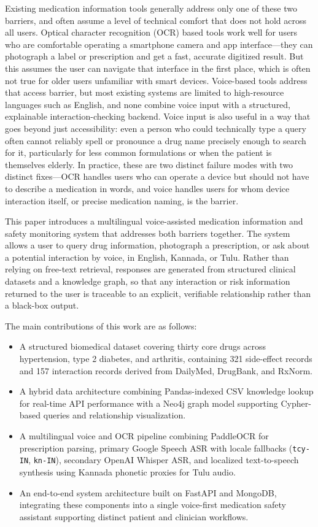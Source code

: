 \documentclass[9pt,journal,twoside,web]{ieeecolor}
\begin{document}
Existing medication information tools generally address only one of these two barriers, and often assume a level of technical comfort that does not hold across all users. Optical character recognition (OCR) based tools work well for users who are comfortable operating a smartphone camera and app interface---they can photograph a label or prescription and get a fast, accurate digitized result. But this assumes the user can navigate that interface in the first place, which is often not true for older users unfamiliar with smart devices. Voice-based tools address that access barrier, but most existing systems are limited to high-resource languages such as English, and none combine voice input with a structured, explainable interaction-checking backend. Voice input is also useful in a way that goes beyond just accessibility: even a person who could technically type a query often cannot reliably spell or pronounce a drug name precisely enough to search for it, particularly for less common formulations or when the patient is themselves elderly. In practice, these are two distinct failure modes with two distinct fixes---OCR handles users who can operate a device but should not have to describe a medication in words, and voice handles users for whom device interaction itself, or precise medication naming, is the barrier.

This paper introduces a multilingual voice-assisted medication information and safety monitoring system that addresses both barriers together. The system allows a user to query drug information, photograph a prescription, or ask about a potential interaction by voice, in English, Kannada, or Tulu. Rather than relying on free-text retrieval, responses are generated from structured clinical datasets and a knowledge graph, so that any interaction or risk information returned to the user is traceable to an explicit, verifiable relationship rather than a black-box output.

The main contributions of this work are as follows:
\begin{itemize}
\item A structured biomedical dataset covering thirty core drugs across hypertension, type 2 diabetes, and arthritis, containing 321 side-effect records and 157 interaction records derived from DailyMed, DrugBank, and RxNorm.
\item A hybrid data architecture combining Pandas-indexed CSV knowledge lookup for real-time API performance with a Neo4j graph model supporting Cypher-based queries and relationship visualization.
\item A multilingual voice and OCR pipeline combining PaddleOCR for prescription parsing, primary Google Speech ASR with locale fallbacks (\texttt{tcy-IN}, \texttt{kn-IN}), secondary OpenAI Whisper ASR, and localized text-to-speech synthesis using Kannada phonetic proxies for Tulu audio.
\item An end-to-end system architecture built on FastAPI and MongoDB, integrating these components into a single voice-first medication safety assistant supporting distinct patient and clinician workflows.
\end{itemize}
\end{document}
